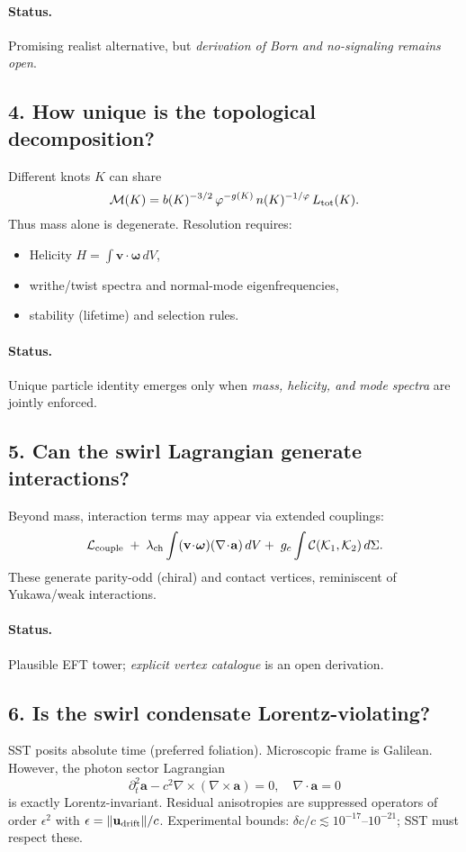 \documentclass[11pt]{article}
\begin{document}
\paragraph{Status.} Promising realist alternative, but \emph{derivation of Born and no-signaling remains open}.

\subsection*{4. How unique is the topological decomposition?}
Different knots $K$ can share
\[
    \mathcal M(K)=b(K)^{-3/2}\,\varphi^{-g(K)}\,n(K)^{-1/\varphi}\,L_{\rm tot}(K).
\]
Thus mass alone is degenerate. Resolution requires:
\begin{itemize}
\item Helicity $H=\int \mathbf v\!\cdot\!\boldsymbol\omega\,dV$,
\item writhe/twist spectra and normal-mode eigenfrequencies,
\item stability (lifetime) and selection rules.
\end{itemize}

\paragraph{Status.} Unique particle identity emerges only when \emph{mass, helicity, and mode spectra} are jointly enforced.

\subsection*{5. Can the swirl Lagrangian generate interactions?}
Beyond mass, interaction terms may appear via extended couplings:
\[
    \mathcal L_{\rm couple}\;+\;\lambda_{\rm ch}\int (\mathbf v\!\cdot\!\boldsymbol\omega)(\nabla\!\cdot\!\mathbf a)\,dV
    +\;g_c \int \mathcal C(\mathcal K_1,\mathcal K_2)\,d\Sigma.
\]
These generate parity-odd (chiral) and contact vertices, reminiscent of Yukawa/weak interactions.

\paragraph{Status.} Plausible EFT tower; \emph{explicit vertex catalogue} is an open derivation.

\subsection*{6. Is the swirl condensate Lorentz-violating?}
SST posits absolute time (preferred foliation). Microscopic frame is Galilean.
However, the photon sector Lagrangian
\[
    \partial_t^2 \mathbf a - c^2 \nabla\times(\nabla\times \mathbf a)=0,\quad \nabla\cdot\mathbf a=0
\]
is exactly Lorentz-invariant. Residual anisotropies are suppressed operators of order $\epsilon^2$ with $\epsilon=\|\mathbf u_{\rm drift}\|/c$.
Experimental bounds: $\delta c/c \lesssim 10^{-17}$--$10^{-21}$; SST must respect these.
\end{document}
